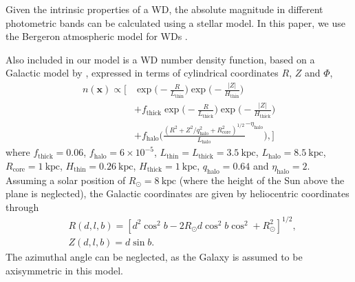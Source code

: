 \documentclass[fleqn,usenatbib]{mnras}
\newcommand{\kpc}{\text{kpc}}
\begin{document}
Given the intrinsic properties of a WD, the absolute magnitude in different photometric bands can be calculated using a stellar model. In this paper, we use the Bergeron atmospheric model for WDs \citep{Bergeron:1995we,Finley:1997zz,Bergeron:2000ce,2001PASP..113..409F}.

Also included in our model is a WD number density function, based on a Galactic model by \cite{2008ApJ...673..864J}, expressed in terms of cylindrical coordinates $R$, $Z$ and $\Phi$,
\begin{equation}\label{eq:numberdensity}
\begin{split}
	n(\mathbf{x}) \propto
	\Bigg[ 
		& \exp\Bigg(-\frac{R}{L_\text{thin}}\Bigg)\exp\Bigg(-\frac{|Z|}{H_\text{thin}}\Bigg) \\
		& +f_\text{thick}\exp\Bigg(-\frac{R}{L_\text{thick}}\Bigg)\exp\Bigg(-\frac{|Z|}{H_\text{thick}}\Bigg) \\
		& +f_\text{halo}\Bigg( \frac{(R^2+Z^2/q_\text{halo}^2+R_\text{core}^2)^{1/2}}{L_\text{halo}}^{-\eta_\text{halo}} \Bigg),
	\Bigg]
\end{split}
\end{equation}
where $f_\text{thick}=0.06$, $f_\text{halo}=6\times10^{-5}$, $L_\text{thin}=L_\text{thick}=3.5~\kpc$, $L_\text{halo}=8.5~\kpc$, $R_\text{core}=1~\kpc$, $H_\text{thin}=0.26~\kpc$, $H_\text{thick}=1~\kpc$, $q_\text{halo}=0.64$ and $\eta_\text{halo} = 2$. Assuming a solar position of $R_\odot=8~\kpc$ (where the height of the Sun above the plane is neglected), the Galactic coordinates are given by heliocentric coordinates through
\begin{equation}
\begin{split}
	& R(d,l,b) = [d^2\cos^2b-2 R_\odot d \cos^2b\cos^2+R_\odot^2]^{1/2}, \\
	& Z(d,l,b) = d \sin b.
\end{split}
\end{equation}
The azimuthal angle can be neglected, as the Galaxy is assumed to be axisymmetric in this model.
\end{document}
